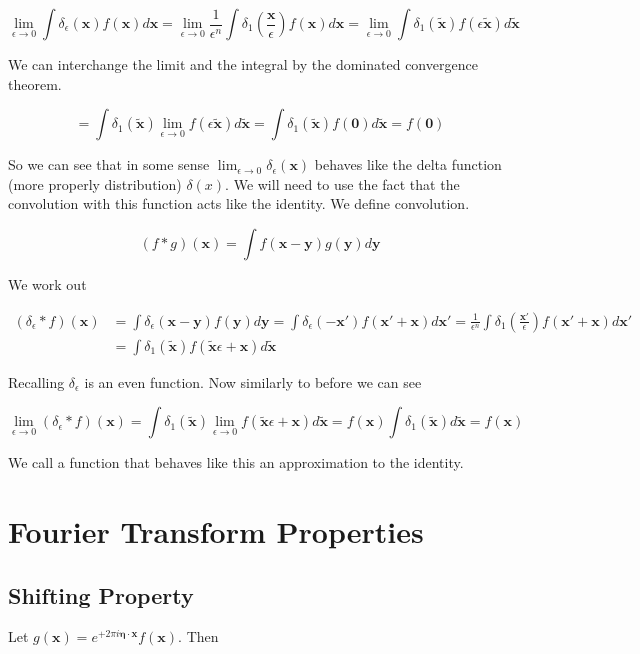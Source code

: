 \documentclass[12pt]{article}
\newcommand{\bv}[1]{\boldsymbol{#1}}
\newcommand{\ep}{\epsilon}
\begin{document}
\[
\lim_{\ep \rightarrow 0} \int \delta_{\ep}(\bv{x}) f(\bv{x}) d\bv{x} =
\lim_{\ep \rightarrow 0} \frac{1}{\ep^n} \int \delta_1\left(\frac{\bv{x}}{\ep}\right) f(\bv{x}) d\bv{x} =
\lim_{\ep \rightarrow 0} \int \delta_1(\tilde{\bv{x}})f(\ep \tilde{\bv{x}}) d\tilde{\bv{x}}
\]

We can interchange the limit and the integral by the dominated convergence theorem.

\[
= \int \delta_1(\tilde{\bv{x}}) \lim_{\ep \rightarrow 0} f(\ep \tilde{\bv{x}}) d\tilde{\bv{x}} = \int \delta_1(\tilde{\bv{x}}) f(\bv{0}) d \tilde{\bv{x}} = f(\bv{0})
\]

So we can see that in some sense $\lim_{\ep \rightarrow 0} \delta_{\ep}(\bv{x})$ behaves like the delta function (more properly distribution) $\delta(x)$.
We will need to use the fact that the convolution with this function  acts like the identity. We define convolution.

\[ (f \ast g)(\bv{x}) = \int f(\bv{x}-\bv{y})g(\bv{y}) d\bv{y} \]

We work out

\begin{align*} (\delta_{\ep} \ast f)(\bv{x}) &= \int \delta_{\ep}(\bv{x}-\bv{y}) f(\bv{y}) d\bv{y} = 
\int \delta_{\ep}(-\bv{x}')f(\bv{x}'+\bv{x}) d\bv{x}'
= \frac{1}{\ep^n} \int \delta_1\left(\frac{\bv{x}'}{\ep}\right) f(\bv{x}'+\bv{x}) d\bv{x}'\\
& = \int \delta_1(\tilde{\bv{x}}) f(\tilde{\bv{x}} \ep + \bv{x}) d\tilde{\bv{x}}
\end{align*}

Recalling $\delta_{\ep}$ is an even function. Now similarly to before we can see

\[
\lim_{\ep \rightarrow 0}(\delta_{\ep} \ast f)(\bv{x}) = \int \delta_1(\tilde{\bv{x}}) \lim_{\ep \rightarrow 0} f(\tilde{\bv{x}}\ep +\bv{x}) d\tilde{\bv{x}} = f(\bv{x}) \int \delta_1(\tilde{\bv{x}}) d\tilde{\bv{x}} = f(\bv{x})
\]

We call a function that behaves like this an approximation to the identity.

\section{Fourier Transform Properties}
\subsection{Shifting Property}
Let $g(\bv{x}) = e^{+2\pi i \bv{\eta}\cdot \bv{x}} f(\bv{x})$. Then
\end{document}
